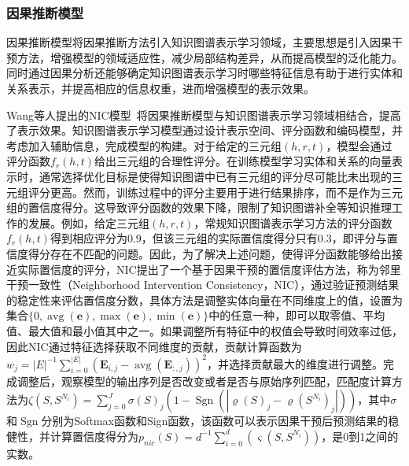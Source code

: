 \documentclass[algorithmlist, AutoFakeBold, AutoFakeSlant, figurelist, tablelist, nomlist, engineering]{seuthesix}
\begin{document}
\subsubsection{因果推断模型}
因果推断模型将因果推断方法引入知识图谱表示学习领域，主要思想是引入因果干预方法，增强模型的领域适应性，减少局部结构差异，从而提高模型的泛化能力。同时通过因果分析还能够确定知识图谱表示学习时哪些特征信息有助于进行实体和关系表示，并提高相应的信息权重，进而增强模型的表示效果。

Wang等人提出的NIC模型~\cite{wang2021neighborhood}将因果推断模型与知识图谱表示学习领域相结合，提高了表示效果。知识图谱表示学习模型通过设计表示空间、评分函数和编码模型，并考虑加入辅助信息，完成模型的构建。对于给定的三元组$(h, r, t)$，模型会通过评分函数$f_r\left(h, t\right)$给出三元组的合理性评分。在训练模型学习实体和关系的向量表示时，通常选择优化目标是使得知识图谱中已有三元组的评分尽可能比未出现的三元组评分更高。然而，训练过程中的评分主要用于进行结果排序，而不是作为三元组的置信度得分。这导致评分函数的效果下降，限制了知识图谱补全等知识推理工作的发展。例如，给定三元组$(h, r, t)$，常规知识图谱表示学习方法的评分函数$f_r\left(h, t\right)$得到相应评分为0.9，但该三元组的实际置信度得分只有0.3，即评分与置信度得分存在不匹配的问题。因此，为了解决上述问题，使得评分函数能够给出接近实际置信度的评分，NIC提出了一个基于因果干预的置信度评估方法，称为邻里干预一致性（Neighborhood Intervention Consistency，NIC），通过验证预测结果的稳定性来评估置信度分数，具体方法是调整实体向量在不同维度上的值，设置为集合$\{0, \operatorname{avg}(\bm{e}), \max (\bm{e}), \min (\bm{e})\}$中的任意一种，即可以取零值、平均值、最大值和最小值其中之一。如果调整所有特征中的权值会导致时间效率过低，因此NIC通过特征选择获取不同维度的贡献，贡献计算函数为$w_j=|E|^{-1} \sum_{i=0}^{|E|}\left(\mathbf{E}_{i, j}-\operatorname{avg}\left(\mathbf{E}_{:, j}\right)\right)^2$，并选择贡献最大的维度进行调整。完成调整后，观察模型的输出序列是否改变或者是否与原始序列匹配，匹配度计算方法为$\zeta\left(S, S^{N_i}\right)=\sum_{j=0}^J \sigma(S)_j\left(1-\operatorname{Sgn}\left(\left|\varrho(S)_j-\varrho\left(S^{N_i}\right)_j\right|\right)\right)$，其中$\sigma$和$\operatorname{Sgn}$分别为Softmax函数和Sign函数，该函数可以表示因果干预后预测结果的稳健性，并计算置信度得分为$p_{n i c}(S)=d^{-1} \sum_{i=0}^d\left(\varsigma\left(S, S^{N_i}\right)\right)$，是0到1之间的实数。
\end{document}
